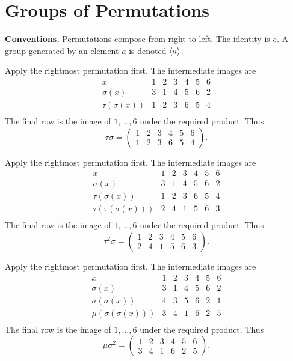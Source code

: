 \section{Groups of Permutations}
\textbf{Conventions.} Permutations compose from right to left. The identity is $e$. A group generated by an element $a$ is denoted $\langle a\rangle$.

\idea Apply the rightmost permutation first. The intermediate images are
\[\begin{array}{c|rrrrrr}x & 1&2&3&4&5&6\\\hline
\sigma(x) & 3 & 1 & 4 & 5 & 6 & 2\\
\tau(\sigma(x)) & 1 & 2 & 3 & 6 & 5 & 4\\\end{array}\]
The final row is the image of $1,\ldots,6$ under the required product. Thus\[\tau\sigma=\begin{pmatrix}1 & 2 & 3 & 4 & 5 & 6\\1 & 2 & 3 & 6 & 5 & 4\end{pmatrix}.\]

\idea Apply the rightmost permutation first. The intermediate images are
\[\begin{array}{c|rrrrrr}x & 1&2&3&4&5&6\\\hline
\sigma(x) & 3 & 1 & 4 & 5 & 6 & 2\\
\tau(\sigma(x)) & 1 & 2 & 3 & 6 & 5 & 4\\
\tau(\tau(\sigma(x))) & 2 & 4 & 1 & 5 & 6 & 3\\\end{array}\]
The final row is the image of $1,\ldots,6$ under the required product. Thus\[\tau^2\sigma=\begin{pmatrix}1 & 2 & 3 & 4 & 5 & 6\\2 & 4 & 1 & 5 & 6 & 3\end{pmatrix}.\]

\idea Apply the rightmost permutation first. The intermediate images are
\[\begin{array}{c|rrrrrr}x & 1&2&3&4&5&6\\\hline
\sigma(x) & 3 & 1 & 4 & 5 & 6 & 2\\
\sigma(\sigma(x)) & 4 & 3 & 5 & 6 & 2 & 1\\
\mu(\sigma(\sigma(x))) & 3 & 4 & 1 & 6 & 2 & 5\\\end{array}\]
The final row is the image of $1,\ldots,6$ under the required product. Thus\[\mu\sigma^2=\begin{pmatrix}1 & 2 & 3 & 4 & 5 & 6\\3 & 4 & 1 & 6 & 2 & 5\end{pmatrix}.\]

